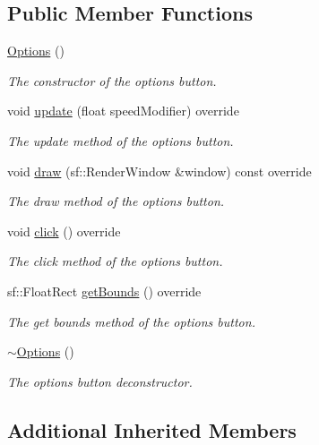 \subsection*{Public Member Functions}
\begin{DoxyCompactItemize}
\item 
\hyperlink{class_options_ab72fb640172a6109e34c8a5366563753}{Options} ()
\begin{DoxyCompactList}\small\item\em The constructor of the options button. \end{DoxyCompactList}\item 
void \hyperlink{class_options_aa331e18456d83724b67f94a0827118c4}{update} (float speed\+Modifier) override
\begin{DoxyCompactList}\small\item\em The update method of the options button. \end{DoxyCompactList}\item 
void \hyperlink{class_options_a9d6bba8e3a427aefa9bad26552e43484}{draw} (sf\+::\+Render\+Window \&window) const override
\begin{DoxyCompactList}\small\item\em The draw method of the options button. \end{DoxyCompactList}\item 
void \hyperlink{class_options_a99920558b09b82026ee06100535db6e3}{click} () override
\begin{DoxyCompactList}\small\item\em The click method of the options button. \end{DoxyCompactList}\item 
sf\+::\+Float\+Rect \hyperlink{class_options_aaea653aa6c981685e1ee5fff6bddb661}{get\+Bounds} () override
\begin{DoxyCompactList}\small\item\em The get bounds method of the options button. \end{DoxyCompactList}\item 
\hyperlink{class_options_a86ddb85b183f8b58af5481f30a42fa92}{$\sim$\+Options} ()
\begin{DoxyCompactList}\small\item\em The options button deconstructor. \end{DoxyCompactList}\end{DoxyCompactItemize}
\subsection*{Additional Inherited Members}


